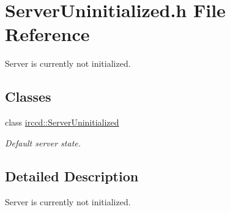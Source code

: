 \hypertarget{a00137}{\section{Server\-Uninitialized.\-h File Reference}
\label{a00137}
}


Server is currently not initialized.  


\subsection*{Classes}
\begin{DoxyCompactItemize}
\item 
class \hyperlink{a00061}{irccd\-::\-Server\-Uninitialized}
\begin{DoxyCompactList}\small\item\em Default server state. \end{DoxyCompactList}\end{DoxyCompactItemize}


\subsection{Detailed Description}
Server is currently not initialized. 
